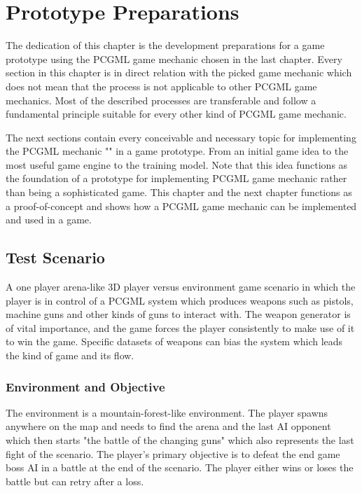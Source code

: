 \documentclass[MGS,Master,english]{twbook}%
\begin{document}
%
%
\clearpage
\chapter{Prototype Preparations} \label{chapter::gamePrototype}
The dedication of this chapter is the development preparations for a game prototype using the \ac{PCGML} game mechanic chosen in the last chapter. Every section in this chapter is in direct relation with the picked game mechanic which does not mean that the process is not applicable to other \ac{PCGML} game mechanics. Most of the described processes are transferable and follow a fundamental principle suitable for every other kind of \ac{PCGML} game mechanic. 

The next sections contain every conceivable and necessary topic for implementing the \ac{PCGML} mechanic "" in a game prototype. From an initial game idea to the most useful game engine to the training model. Note that this idea functions as the foundation of a prototype for implementing \ac{PCGML} game mechanic rather than being a sophisticated game. This chapter and the next chapter functions as a proof-of-concept and shows how a \ac{PCGML} game mechanic can be implemented and used in a game.

\section{Test Scenario}
A one player arena-like \ac{3D} player versus environment game scenario in which the player is in control of a \ac{PCGML} system which produces weapons such as pistols, machine guns and other kinds of guns to interact with. The weapon generator is of vital importance, and the game forces the player consistently to make use of it to win the game. Specific datasets of weapons can bias the system which leads the kind of game and its flow. 

\subsection{Environment and Objective}
The environment is a mountain-forest-like environment. The player spawns anywhere on the map and needs to find the arena and the last \ac{AI} opponent which then starts "the battle of the changing guns" which also represents the last fight of the scenario. The player's primary objective is to defeat the end game boss \ac{AI} in a battle at the end of the scenario. The player either wins or loses the battle but can retry after a loss.
\end{document}
